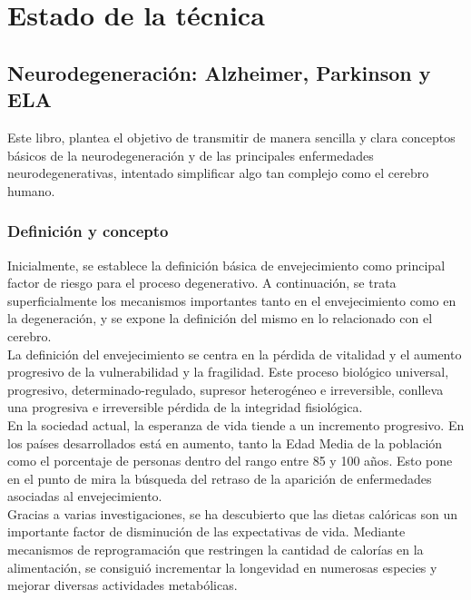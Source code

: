 \chapter{Estado de la técnica}

\section{Neurodegeneración: Alzheimer, Parkinson y ELA}

Este libro, plantea el objetivo de transmitir de manera sencilla y clara conceptos básicos de la neurodegeneración y de las principales enfermedades neurodegenerativas, intentado simplificar algo tan complejo como el cerebro humano. \cite{Neurodeg64:online}

\subsection{Definición y concepto}

Inicialmente, se establece la definición básica de envejecimiento como principal factor de riesgo para el proceso degenerativo. A continuación, se trata superficialmente los mecanismos importantes tanto en el envejecimiento como en la degeneración, y se expone la definición del mismo en lo relacionado con el cerebro.\\

La definición del envejecimiento se centra en la pérdida de vitalidad y el aumento progresivo de la vulnerabilidad y la fragilidad.  Este proceso biológico universal, progresivo, determinado-regulado, supresor heterogéneo e irreversible, conlleva una progresiva e irreversible pérdida de la integridad fisiológica.\\

En la sociedad actual, la esperanza de vida tiende a un incremento progresivo. En los países desarrollados está en aumento, tanto la Edad Media de la población como el porcentaje de personas dentro del rango entre 85 y 100 años. Esto pone en el punto de mira la búsqueda del retraso de la aparición de enfermedades asociadas al envejecimiento.\\

Gracias a varias investigaciones, se ha descubierto que las dietas calóricas son un importante factor de disminución de las expectativas de vida. Mediante mecanismos de reprogramación que restringen la cantidad de calorías en la alimentación, se consiguió incrementar la longevidad en numerosas especies y mejorar diversas actividades metabólicas. \\

